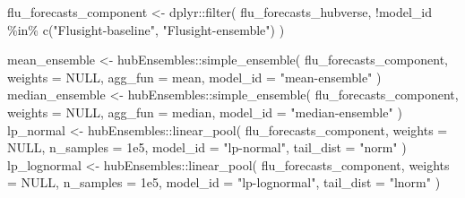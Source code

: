 \documentclass[
]{article}
\newenvironment{Shaded}{\begin{snugshade}}{\end{snugshade}}
\newcommand{\AttributeTok}[1]{\textcolor[rgb]{0.40,0.45,0.13}{#1}}
\newcommand{\ConstantTok}[1]{\textcolor[rgb]{0.56,0.35,0.01}{#1}}
\newcommand{\FloatTok}[1]{\textcolor[rgb]{0.68,0.00,0.00}{#1}}
\newcommand{\FunctionTok}[1]{\textcolor[rgb]{0.28,0.35,0.67}{#1}}
\newcommand{\NormalTok}[1]{\textcolor[rgb]{0.00,0.23,0.31}{#1}}
\newcommand{\OtherTok}[1]{\textcolor[rgb]{0.00,0.23,0.31}{#1}}
\newcommand{\SpecialCharTok}[1]{\textcolor[rgb]{0.37,0.37,0.37}{#1}}
\newcommand{\StringTok}[1]{\textcolor[rgb]{0.13,0.47,0.30}{#1}}
\begin{document}
\begin{Shaded}
\begin{Highlighting}[]
\NormalTok{flu\_forecasts\_component }\OtherTok{\textless{}{-}}\NormalTok{ dplyr}\SpecialCharTok{::}\FunctionTok{filter}\NormalTok{(}
\NormalTok{  flu\_forecasts\_hubverse,}
  \SpecialCharTok{!}\NormalTok{model\_id }\SpecialCharTok{\%in\%} \FunctionTok{c}\NormalTok{(}\StringTok{"Flusight{-}baseline"}\NormalTok{, }\StringTok{"Flusight{-}ensemble"}\NormalTok{)}
\NormalTok{)}

\NormalTok{mean\_ensemble }\OtherTok{\textless{}{-}}\NormalTok{ hubEnsembles}\SpecialCharTok{::}\FunctionTok{simple\_ensemble}\NormalTok{(}
\NormalTok{  flu\_forecasts\_component,}
  \AttributeTok{weights =} \ConstantTok{NULL}\NormalTok{,}
  \AttributeTok{agg\_fun =}\NormalTok{ mean,}
  \AttributeTok{model\_id =} \StringTok{"mean{-}ensemble"}
\NormalTok{)}
\NormalTok{median\_ensemble }\OtherTok{\textless{}{-}}\NormalTok{ hubEnsembles}\SpecialCharTok{::}\FunctionTok{simple\_ensemble}\NormalTok{(}
\NormalTok{  flu\_forecasts\_component,}
    \AttributeTok{weights =} \ConstantTok{NULL}\NormalTok{,}
    \AttributeTok{agg\_fun =}\NormalTok{ median,}
    \AttributeTok{model\_id =} \StringTok{"median{-}ensemble"}
\NormalTok{  )}
\NormalTok{lp\_normal }\OtherTok{\textless{}{-}}\NormalTok{ hubEnsembles}\SpecialCharTok{::}\FunctionTok{linear\_pool}\NormalTok{(}
\NormalTok{  flu\_forecasts\_component,}
  \AttributeTok{weights =} \ConstantTok{NULL}\NormalTok{,}
  \AttributeTok{n\_samples =} \FloatTok{1e5}\NormalTok{,}
  \AttributeTok{model\_id =} \StringTok{"lp{-}normal"}\NormalTok{,}
  \AttributeTok{tail\_dist =} \StringTok{"norm"}
\NormalTok{)}
\NormalTok{lp\_lognormal }\OtherTok{\textless{}{-}}\NormalTok{ hubEnsembles}\SpecialCharTok{::}\FunctionTok{linear\_pool}\NormalTok{(}
\NormalTok{  flu\_forecasts\_component,}
  \AttributeTok{weights =} \ConstantTok{NULL}\NormalTok{,}
  \AttributeTok{n\_samples =} \FloatTok{1e5}\NormalTok{,}
  \AttributeTok{model\_id =} \StringTok{"lp{-}lognormal"}\NormalTok{,}
  \AttributeTok{tail\_dist =} \StringTok{"lnorm"}
\NormalTok{) }
\end{Highlighting}
\end{Shaded}
\end{document}
